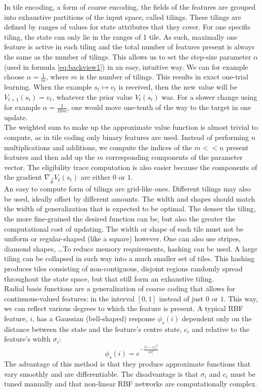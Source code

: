 \documentclass[a4paper]{article}
\begin{document}
In tile encoding, a form of coarse encoding, the fields of the features are grouped into exhaustive partitions of the input space, called tilings. These tilings are defined by ranges of values for state attributes that they cover. For one specific tiling, the state can only lie in the ranges of 1 tile. As such, maximally one feature is active in each tiling and the total number of features present is always the same as the number of tilings. This allows us to set the step-size parameter $\alpha$ (used in formula \ref{eq:backview1}) in an easy, intuitive way. We can for example choose $\alpha = \frac{1}{m}$, where $m$ is the number of tilings. This results in exact one-trial learning. When the example $s_t \mapsto v_t$ is received, then the new value will be $V_{t+1}(s_t) = v_t$, whatever the prior value $V_t(s_t)$ was. For a slower change using for example $\alpha=\frac{1}{10m}$, one would move one-tenth of the way to the target in one update.\\
The weighted sum to make up the approximate value function is almost trivial to compute, as in tile coding only binary features are used. Instead of performing $n$ multiplications and additions, we compute the indices of the $m<<n$ present features and then add up the $m$ corresponding components of the parameter vector. The eligibility trace computation is also easier because the components of the gradient $\nabla_{\overrightarrow{\theta}} V_t(s_t)$ are either $0$ or $1$.\\
An easy to compute form of tilings are grid-like ones. Different tilings may also be used, ideally offset by different amounts. The width and shapes should match the width of generalization that is expected to be optimal. The denser the tiling, the more fine-grained the desired function can be, but also the greater the computational cost of updating. The width or shape of each tile must not be uniform or regular-shaped (like a square) however. One can also use stripes, diamond shapes, \dots To reduce memory requirements, hashing can be used. A large tiling can be collapsed in such way into a much smaller set of tiles. This hashing produces tiles consisting of non-contiguous, disjoint regions randomly spread throughout the state space, but that still form an exhaustive tiling.\\
Radial basis functions are a generalization of coarse coding that allows for continuous-valued features: in the interval $[0,1]$ instead of just $0$ or $1$. This way, we can reflect various degrees to which the feature is present. A typical RBF feature, $i$, has a Gaussian (bell-shaped) response $\phi_s(i)$ dependent only on the distance between the state and the feature's centre state, $c_i$ and relative to the feature's width $\sigma_i$:
\begin{equation}
\phi_s(i) = e^{-\frac{||s-c_i||^2}{2 \sigma^2_i}}
\end{equation}
The advantage of this method is that they produce approximate functions that vary smoothly and are differentiable. The disadvantage is that $\sigma_i$ and $c_i$ must be tuned manually and that non-linear RBF networks are computationally complex.\\
\end{document}
